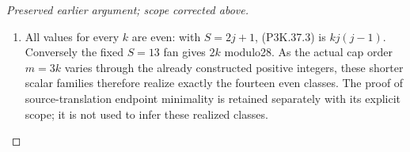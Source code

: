 \begin{proof}[Preserved earlier argument; scope corrected above]
\begin{enumerate}[label=\arabic*.]
\item All values for every \(k\) are even: with \(S=2j+1\), (P3K.37.3) is
\(kj(j-1)\). Conversely the fixed \(S=13\) fan gives \(2k\) modulo28.
As the actual cap order \(m=3k\) varies through the already constructed
positive integers, these shorter scalar families therefore realize exactly
the fourteen even classes. The proof of source-translation endpoint
minimality is retained separately with its explicit scope; it is not used
to infer these realized classes.

\end{enumerate}
\end{proof}